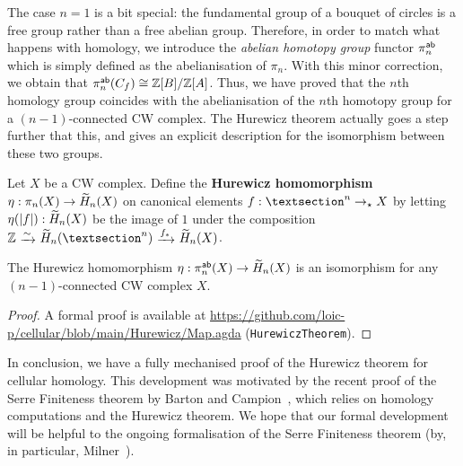 \documentclass[a4page]{article}
\begin{document}
The case \( n = 1 \) is a bit special: the fundamental group of a bouquet of circles is a
free group rather than a free abelian group. Therefore, in order to match what happens with homology,
we introduce the \emph{abelian homotopy group} functor \( \textnormal{\ensuremath{{\pi}_{n}^{\mathsf{ab}}}} \) which is simply defined as the
abelianisation of \( \pi_n \).
%
With this minor correction, we obtain that $\textnormal{\ensuremath{{\pi}_{n}^{\mathsf{ab}}}}(C_f) \cong \mathbb{Z}[B]/\mathbb{Z}[A]$.
%
Thus, we have proved that the \( n \)th homology group coincides with the abelianisation of the
\( n \)th homotopy group for a \( (n - 1) \)-connected CW complex.
%
The Hurewicz theorem actually goes a step further that this, and gives an explicit description
for the isomorphism between these two groups.

\begin{theorem}
  Let $X$ be a CW complex.
  Define the \textbf{Hurewicz homomorphism} $\eta : \pi_n(X) \to \textnormal{\ensuremath{\widetilde{H}_{n}}}(X)$ on canonical
  elements $f : \sphere{n} \to_\star X$ by letting $\eta(\left| f \right|) : \textnormal{\ensuremath{\widetilde{H}_{n}}}(X)$ be the image
  of $1$ under the composition
  \( \bZ\ \raisemath{-1pt}{\xrightarrow{\sim}}\ \hredcw{n}(\sphere{n})
  \ \raisemath{-1pt}{\xrightarrow{f_*}}\ \hredcw{n}{(X)} \).
\end{theorem}

\begin{theorem}
  The Hurewicz homomorphism $\eta : \textnormal{\ensuremath{{\pi}_{n}^{\mathsf{ab}}}}(X) \to \textnormal{\ensuremath{\widetilde{H}_{n}}}(X)$ is an isomorphism for any
  $(n-1)$-connected CW complex $X$.
\end{theorem}

\begin{proof}
  A formal proof is available at \url{https://github.com/loic-p/cellular/blob/main/Hurewicz/Map.agda}
  (\texttt{HurewiczTheorem}).
\end{proof}

In conclusion, we have a fully mechanised proof of the Hurewicz theorem for cellular homology.
%
This development was motivated by the recent proof of the Serre Finiteness theorem by Barton and
Campion~\cite{SerreFiniteness}, which relies on homology computations and the Hurewicz theorem.
%
We hope that our formal development will be helpful to the ongoing formalisation of the Serre
Finiteness theorem (by, in particular, Milner~\cite{MilnerTalk}).

\printbibliography
\end{document}

